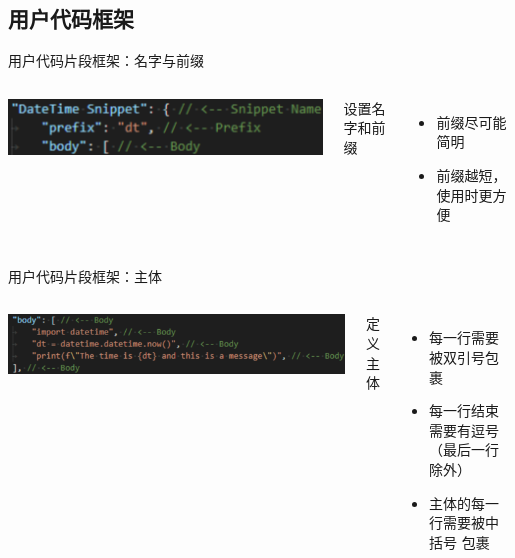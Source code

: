 \documentclass{beamer}
\begin{document}
\subsection{用户代码框架}
\begin{frame}{用户代码片段框架：名字与前缀}
    \begin{columns}
        \begin{minipage}[c][\textheight][c]{\linewidth}
            \centering
            \includegraphics[scale=0.35]{pic/prefix.png}
        \end{minipage}
        设置名字和前缀
        \begin{itemize}
            \item 前缀尽可能简明
            \item 前缀越短，使用时更方便
        \end{itemize}
    \end{columns}
\end{frame}

\begin{frame}{用户代码片段框架：主体}
    \begin{columns}
        \begin{minipage}[c][\textheight][c]{\linewidth}
            \centering
            \includegraphics[scale=0.20]{pic/body.png}
        \end{minipage}
        定义主体
        \begin{itemize}
            \item 每一行需要被双引号包裹
            \item 每一行结束需要有逗号（最后一行除外）
            \item 主体的每一行需要被中括号 \text{[ ]}包裹
        \end{itemize}
    \end{columns}
\end{frame}
\end{document}
